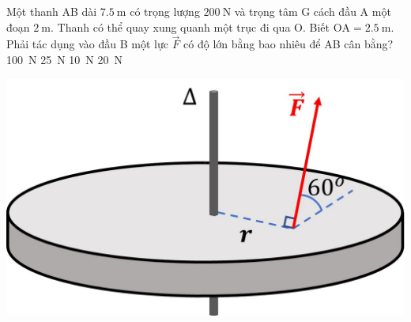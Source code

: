 \begin{ex}
	Một thanh AB dài $\SI{7.5}{\meter}$ có trọng lượng $\SI{200}{\newton}$ và trọng tâm G cách đầu A một đoạn $\SI{2}{\meter}$. Thanh có thể quay xung quanh một trục đi qua O. Biết $\mathrm{OA}=\SI{2.5}{\meter}$. Phải tác dụng vào đầu B một lực $\vec{F}$ có độ lớn bằng bao nhiêu để AB cân bằng?
	\choice
	{\SI{100}{\newton}}
	{\SI{25}{\newton}}
	{\SI{10}{\newton}}
	{\True \SI{20}{\newton}}
	\loigiai{}
\end{ex}
\begin{ex}
	{\vspace{-0.75cm}\includegraphics[scale=0.2]{../figs/D10-KTTX3-001-6}}
	
	\loigiai{}
\end{ex}
